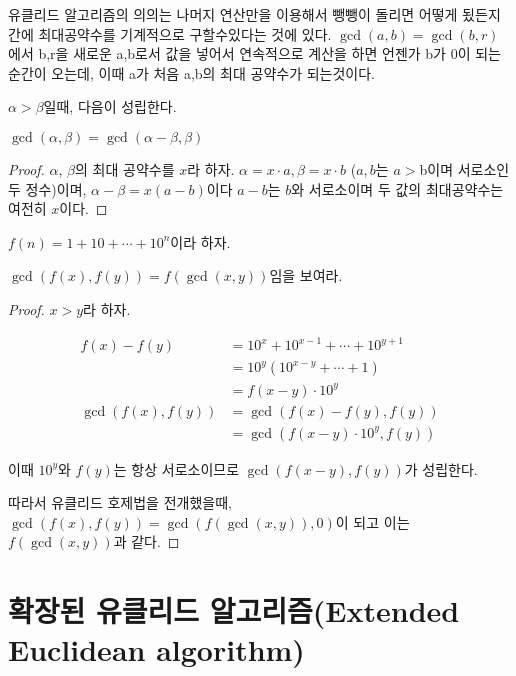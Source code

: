 \vspace{1\baselineskip}

유클리드 알고리즘의 의의는 나머지 연산만을 이용해서 뺑뺑이 돌리면 어떻게 됬든지 간에 최대공약수를 기계적으로 구할수있다는 것에 있다. 
$\gcd(a,b) = \gcd(b,r)$에서 b,r을 새로운 a,b로서 값을 넣어서 연속적으로 계산을 하면 언젠가 b가 0이 되는 순간이 오는데,
이때 a가 처음 a,b의 최대 공약수가 되는것이다.


\begin{theorem}
    $\alpha > \beta$일때, 다음이 성립한다.
    
    $\gcd(\alpha ,\beta) = \gcd(\alpha-\beta , \beta)$  
\end{theorem}

\begin{proof}
    $\alpha$, $\beta$의 최대 공약수를  $x$라 하자.
    $\alpha = x \cdot a , \beta = x \cdot b$ ($a,b$는 $a>$b이며 서로소인 두 정수)이며, $\alpha -\beta = x(a-b)$이다 $a-b$는 $b$와 서로소이며 두 값의 최대공약수는 여전히 $x$이다.
\end{proof}




\begin{corollary}
    $f(n) = 1+10+\cdots +10^n$이라 하자.
    
    $ \gcd(f(x) , f(y)) = f(\gcd(x,y)) $임을 보여라.
\end{corollary}

\begin{proof}
    $x > y$라 하자.

    \begin{align*}
        f(x) - f(y) &= 10^x + 10^{x-1} + \cdots + 10^{y+1}\\
        &= 10^y(10^{x-y} + \cdots + 1)\\
        &= f(x-y) \cdot 10^y\\
        \gcd(f(x),f(y)) &= \gcd(f(x)-f(y),f(y)) \\
            &= \gcd(f(x-y) \cdot 10^{y},f(y))
    \end{align*}
    

이때 $10^{y}$와 $f(y)$는 항상 서로소이므로 $\gcd(f(x-y), f(y))$가 성립한다. %

따라서 유클리드 호제법을 전개했을때, $\gcd(f(x), f(y)) = \gcd(f(\gcd(x,y)),0)$이 되고 
이는$f(\gcd(x,y))$과 같다.
\end{proof}


\section{확장된 유클리드 알고리즘(Extended Euclidean algorithm)} 

